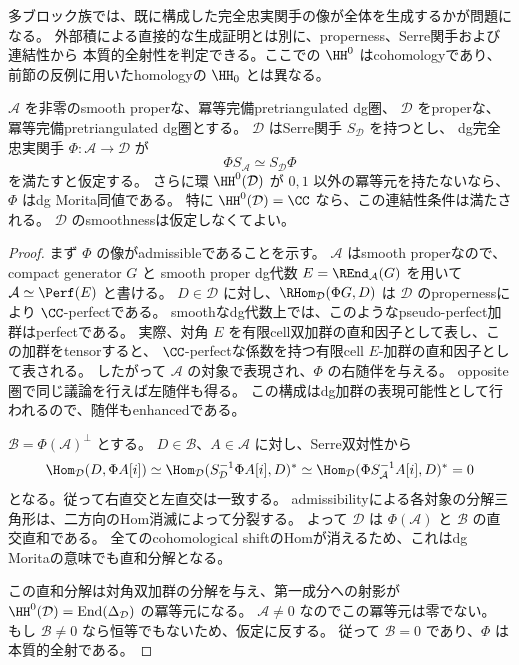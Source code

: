 多ブロック族では、既に構成した完全忠実関手の像が全体を生成するかが問題になる。
外部積による直接的な生成証明とは別に、properness、Serre関手および連結性から
本質的全射性を判定できる。ここでの \(\HH^0\) はcohomologyであり、
前節の反例に用いたhomologyの \(\HH_0\) とは異なる。

\begin{proposition}[Serreと連結性による全生成判定]
\label{prop:serre-connected-generation}
 \(\mathcal A\) を非零のsmooth properな、冪等完備pretriangulated dg圏、
 \(\mathcal D\) をproperな、冪等完備pretriangulated dg圏とする。
 \(\mathcal D\) はSerre関手 \(S_{\mathcal D}\) を持つとし、
 dg完全忠実関手 \(\Phi:\mathcal A\to\mathcal D\) が
 \[
 \Phi S_{\mathcal A}\simeq S_{\mathcal D}\Phi
 \]
 を満たすと仮定する。
 さらに環 \(\HH^0(\mathcal D)\) が \(0,1\) 以外の冪等元を持たないなら、
 \(\Phi\) はdg Morita同値である。
 特に \(\HH^0(\mathcal D)=\CC\) なら、この連結性条件は満たされる。
 \(\mathcal D\) のsmoothnessは仮定しなくてよい。
\end{proposition}
\begin{proof}
 まず \(\Phi\) の像がadmissibleであることを示す。
 \(\mathcal A\) はsmooth properなので、compact generator \(G\) と
 smooth proper dg代数 \(E=\REnd_{\mathcal A}(G)\) を用いて
 \(\mathcal A\simeq\Perf(E)\) と書ける。
 \(D\in\mathcal D\) に対し、\(\RHom_{\mathcal D}(\Phi G,D)\) は
 \(\mathcal D\) のpropernessにより \(\CC\)-perfectである。
 smoothなdg代数上では、このようなpseudo-perfect加群はperfectである。
 実際、対角 \(E\) を有限cell双加群の直和因子として表し、この加群をtensorすると、
 \(\CC\)-perfectな係数を持つ有限cell \(E\)-加群の直和因子として表される。
 したがって \(\mathcal A\) の対象で表現され、\(\Phi\) の右随伴を与える。
 opposite圏で同じ議論を行えば左随伴も得る。
 この構成はdg加群の表現可能性として行われるので、随伴もenhancedである。

 \(\mathcal B=\Phi(\mathcal A)^\perp\) とする。
 \(D\in\mathcal B\)、\(A\in\mathcal A\) に対し、Serre双対性から
 \[
 \Hom_{\mathcal D}(D,\Phi A[i])
 \simeq
 \Hom_{\mathcal D}(S_{\mathcal D}^{-1}\Phi A[i],D)^*
 \simeq
 \Hom_{\mathcal D}(\Phi S_{\mathcal A}^{-1}A[i],D)^*=0
 \]
 となる。従って右直交と左直交は一致する。
 admissibilityによる各対象の分解三角形は、二方向のHom消滅によって分裂する。
 よって \(\mathcal D\) は \(\Phi(\mathcal A)\) と \(\mathcal B\) の直交直和である。
 全てのcohomological shiftのHomが消えるため、これはdg Moritaの意味でも直和分解となる。

 この直和分解は対角双加群の分解を与え、第一成分への射影が
 \(\HH^0(\mathcal D)=\operatorname{End}(\Delta_{\mathcal D})\) の冪等元になる。
 \(\mathcal A\ne0\) なのでこの冪等元は零でない。
 もし \(\mathcal B\ne0\) なら恒等でもないため、仮定に反する。
 従って \(\mathcal B=0\) であり、\(\Phi\) は本質的全射である。
\end{proof}


